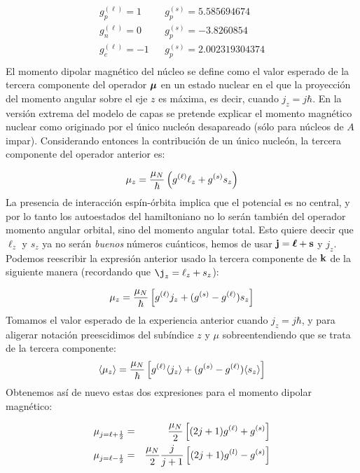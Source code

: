 \begin{eqnarray}
	g_p^{(\ell)} = 1 & & g_p^{(s)} = \num{5.585694674} \\
	g_n^{(\ell)} = 0 & & g_p^{(s)} = \num{-3.8260854} \\
	g_e^{(\ell)} = -1 & & g_p^{(s)} = \num{2.002319304374} \\
\end{eqnarray}
El momento dipolar magnético del núcleo se define como el valor esperado de la tercera componente del operador $\boldsymbol{\mu}$ en un estado nuclear en el que la proyección del momento angular sobre el eje $z$ es máxima, es decir, cuando $j_z=j\hbar$. En la versión extrema del modelo de capas se pretende explicar el momento magnético nuclear como originado por el único nucleón desapareado (sólo para núcleos de $A$ impar). Considerando entonces la contribución de un único nucleón, la tercera componente del operador anterior es:

\begin{equation}
	\mu_z = \frac{\mu_N}{\hbar} \left( g^{(\ell)} \ell_z + g^{(s)} s_z \right)
\end{equation}
La presencia de interacción espín-órbita implica que el potencial es no central, y por lo tanto los autoestados del hamiltoniano no lo serán también del operador momento angular orbital, sino del momento angular total. Esto quiere deecir que $\ell_z$ y $s_z$ ya no serán \textit{buenos} números cuánticos, hemos de usar $\mathbf{j}=\boldsymbol{\ell}+\mathbf{s}$ y $j_z$. Podemos reescribir la expresión anterior usado la tercera componente de $\mathbf{k}$ de la siguiente manera (recordando que $\j_z=\ell_z + s_z$):

\begin{equation}
	\mu_z = \frac{\mu_N}{\hbar} \left[ g^{(\ell)}j_z + (g^{(s)}-g^{(\ell)})  s_z \right]
\end{equation}
Tomamos el valor esperado de la experiencia anterior cuando $j_z=j\hbar$, y para aligerar notación preescidimos del subíndice $z$ y $\mu$ sobreentendiendo que se trata de la tercera componente:
\begin{equation}
	\langle \mu_z \rangle = \frac{\mu_N}{\hbar} \left[ g^{(\ell)} \langle j_z \rangle + (g^{(s)}-g^{(\ell)}) \langle s_z \rangle \right]
\end{equation}
Obtenemos así de nuevo estas dos expresiones para el momento dipolar magnético:

\begin{eqnarray}
	\mu_{j=\ell+\frac{1}{2}} & = & \frac{\mu_N}{2} \left[ (2j+1)g^{(\ell)} + g^{(s)} \right] \\
	\mu_{j=\ell-\frac{1}{2}} & = & \frac{\mu_N}{2} \frac{j}{j+1} \left[ (2j+1)g^{(l)} - g^{(s)}  \right]
\end{eqnarray}

